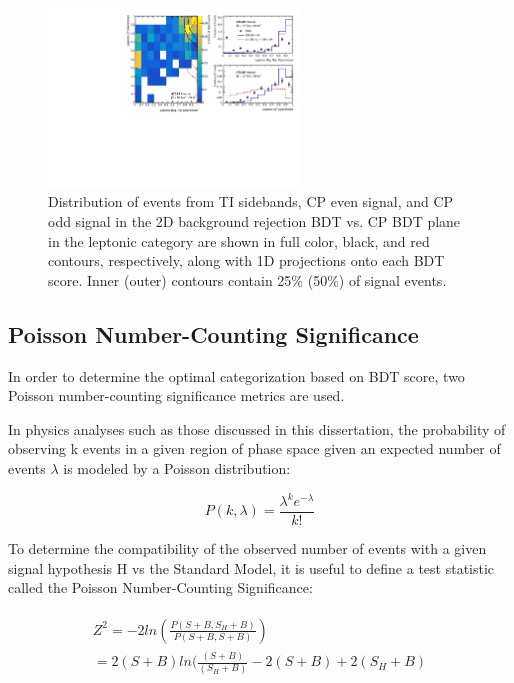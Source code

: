 \begin{figure}[htbp]
 \centering
  	\includegraphics[width=0.6\textwidth]{figures/tthcp_chapter/categorization_xgb/BDTdist_lep_zero.pdf}
  \caption{Distribution of events from TI sidebands, CP even signal, and CP odd signal in the 2D background rejection BDT vs. CP BDT plane  in the leptonic category are shown in full color, black, and red contours, respectively, along with 1D projections onto each BDT score. Inner (outer) contours contain 25\% (50\%) of signal events.}
  \label{fig:2dbdtlep}
\end{figure}


\subsection{Poisson Number-Counting Significance}
In order to determine the optimal categorization based on BDT score, two Poisson number-counting significance metrics are used.

In physics analyses such as those discussed in this dissertation, the probability of observing k events in a given region of phase space given an expected number of events $\lambda$ is modeled by a Poisson distribution:

\begin{equation}
P(k, \lambda) = \frac{\lambda^{k}e^{-\lambda}}{k!}
\end{equation}

To determine the compatibility of the observed number of events with a given signal hypothesis H vs the Standard Model, it is useful to define a test statistic called the Poisson Number-Counting Significance:

\begin{align}
\begin{aligned}
Z^{2} = -2 ln(\frac{P(S + B, S_{H} + B)}{P(S + B, S + B)}) \\
= 2(S + B) ln(\frac{(S + B)}{(S_{H} + B)} -2(S + B) + 2(S_{H} + B)
\end{aligned}
\end{align}

